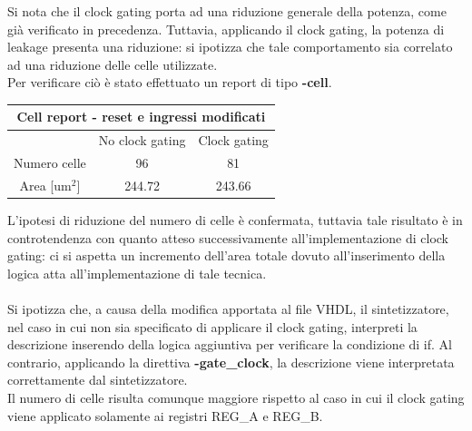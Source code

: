 \documentclass[11pt,  english, makeidx, a4paper, titlepage, oneside]{book}
\begin{document}
\vspace{0.3cm}          
Si nota che il clock gating porta ad una riduzione generale della potenza, come già verificato in precedenza. Tuttavia, applicando il clock gating, la potenza di leakage presenta una riduzione: si ipotizza che tale comportamento sia correlato ad una riduzione delle celle utilizzate.
\\
Per verificare ciò è stato effettuato un report di tipo \textbf{-cell}.
\\
\begin{center}
	\begin{tabular}{|c|c|c|}
	\hline
	\multicolumn{3}{c}{Cell report - reset e ingressi modificati}\\
	\hline
	& No clock gating & Clock gating \\
	\hline
	Numero celle & 96 & 81 \\
	\hline
	 Area [um$^2$] & 244.72 & 243.66 \\
	\hline
	\end{tabular}	
\end{center}
\vspace{0.3cm} 
 L'ipotesi di riduzione del numero di celle è confermata, tuttavia tale risultato è in controtendenza con quanto atteso successivamente all'implementazione di clock gating: ci si aspetta un incremento dell'area totale dovuto all'inserimento della logica atta all'implementazione di tale tecnica.
 \\\\
Si ipotizza che, a causa della modifica apportata al file VHDL, il sintetizzatore, nel caso in cui non sia specificato di applicare il clock gating, interpreti la descrizione inserendo della logica aggiuntiva per verificare la condizione di if. Al contrario, applicando la direttiva \textbf{-gate\_clock}, la descrizione viene interpretata correttamente dal sintetizzatore.
\\
Il numero di celle risulta comunque maggiore rispetto al caso in cui il clock gating viene applicato solamente ai registri REG\_A e REG\_B.
\\
\end{document}
